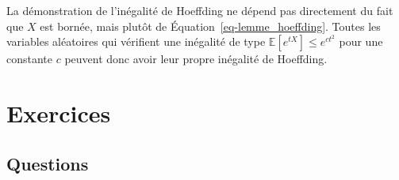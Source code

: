 \documentclass[
  10,
  letterpaper,
  DIV=11,
  numbers=noendperiod]{scrreport}
\theoremstyle{plain}
\theoremstyle{definition}
\theoremstyle{plain}
\theoremstyle{definition}
\theoremstyle{definition}
\theoremstyle{plain}
\theoremstyle{remark}
\begin{document}
La démonstration de l'inégalité de Hoeffding ne dépend pas directement
du fait que \(X\) est bornée, mais plutôt de
Équation~\ref{eq-lemme_hoeffding}. Toutes les variables aléatoires qui
vérifient une inégalité de type
\(\mathbb{E}[e^{tX}]\leqslant e^{c t^2}\) pour une constante \(c\)
peuvent donc avoir leur propre inégalité de Hoeffding.


\hypertarget{exercices-2}{%
\chapter*{Exercices}\label{exercices-2}}


\hypertarget{questions-1}{%
\section*{Questions}\label{questions-1}}

\end{document}
